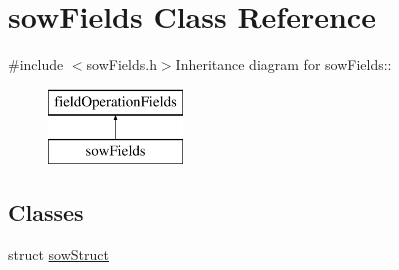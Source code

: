 \hypertarget{classsow_fields}{
\section{sowFields Class Reference}
\label{classsow_fields}
}


{\ttfamily \#include $<$sowFields.h$>$}Inheritance diagram for sowFields::\begin{figure}[H]
\begin{center}
\leavevmode
\includegraphics[height=2cm]{classsow_fields}
\end{center}
\end{figure}
\subsection*{Classes}
\begin{DoxyCompactItemize}
\item 
struct \hyperlink{structsow_fields_1_1sow_struct}{sowStruct}
\end{DoxyCompactItemize}

